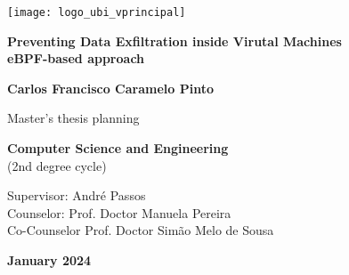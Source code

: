 \begin{titlepage}
\begin{center}

\begin{flushright}
 \texttt{[image: logo\_ubi\_vprincipal]}\\


\vspace{7.6cm}

\rostotitulo \textbf{Preventing Data Exfiltration inside Virutal Machines} \\
\rostosubtit \textbf{eBPF-based approach}\\

\vspace{1.8cm}

\rostonomes \textbf{Carlos Francisco Caramelo Pinto}\\

\vspace{1.4cm}


\rostooutros Master's thesis planning

\rostonomes \textbf{Computer Science and Engineering}\\
\rostooutros (2nd degree cycle)\\

\vspace{3.3cm}

\rostooutros Supervisor: André Passos\\
\rostooutros Counselor: Prof. Doctor Manuela Pereira\\
\rostooutros Co-Counselor Prof. Doctor Simão Melo de Sousa

\vspace{1.4cm}

\rostooutros \textbf{January 2024}

\end{flushright}

\end{center}
\end{titlepage}
